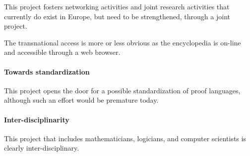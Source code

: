 This project fosters networking activities and joint research activities that
currently do exist in Europe, but need to be strengthened, through a
joint project.

The transnational access is more or less obvious as
the encyclopedia is on-line and accessible through a web browser.

\paragraph{Towards standardization}
This project opens the door for a possible standardization of proof
languages, although such an effort would be premature today.

\paragraph{Inter-disciplinarity}
This project that includes mathematicians, logicians, and computer
scientists is clearly inter-disciplinary.

 

